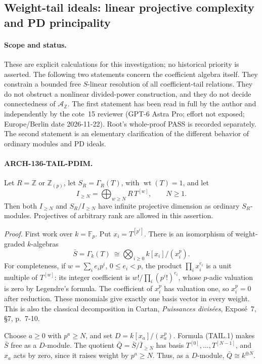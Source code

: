 \subsection{Weight-tail ideals: linear projective complexity and PD principality}
\label{arch136:tail-pdim}

\paragraph{Scope and status.}
These are explicit calculations for this investigation; no historical
priority is asserted.
The following two statements concern the coefficient algebra itself.
They constrain a bounded free \(S\)-linear resolution of all coefficient-tail
relations. They do not obstruct a nonlinear divided-power construction, and
they do not decide connectedness of \(\mathcal A_{\mathbb Z}\).
The first statement has been read in full by the author and independently
by the cote~15 reviewer (GPT-6 Astra Pro; effort not exposed;
Europe/Berlin date 2026-11-22). Root's whole-proof PASS is recorded
separately. The second statement is an elementary clarification of the
different behavior of ordinary modules and PD ideals.

\paragraph{ARCH-136-TAIL-PDIM.}
Let \(R=\mathbb Z\) or \(\mathbb Z_{(p)}\), let
\(S_R=\Gamma_R(T)\), with \(\operatorname{wt}(T)=1\), and let
\[
 I_{\ge N}=\bigoplus_{w\ge N}R\,T^{[w]},\qquad N\ge1.
\]
Then both \(I_{\ge N}\) and \(S_R/I_{\ge N}\) have infinite projective
dimension as ordinary \(S_R\)-modules. Projectives of arbitrary rank
are allowed in this assertion.

\emph{Proof.}
First work over \(k=\mathbb F_p\). Put \(x_i=T^{[p^i]}\). There is an
isomorphism of weight-graded \(k\)-algebras
\[
 \bar S=\Gamma_k(T)\ \cong
 \bigotimes_{i\ge0}k[x_i]/(x_i^p).
 \tag{TAIL.1}
\]
For completeness, if \(w=\sum_i e_i p^i\), \(0\le e_i<p\), the product
\(\prod_i x_i^{e_i}\) is a unit multiple of \(T^{[w]}\): its integer
coefficient is \(w!/\prod_i(p^i!)^{e_i}\), whose \(p\)-adic valuation is
zero by Legendre's formula. The coefficient of \(x_i^p\) has valuation
one, so \(x_i^p=0\) after reduction. These monomials give exactly one
basis vector in every weight. This is also the classical decomposition
in Cartan, \emph{Puissances divis\'ees}, Expos\'e~7, \S7, p.~7-10.

Choose \(a\ge0\) with \(p^a\ge N\), and set
\(D=k[x_a]/(x_a^p)\). Formula (TAIL.1) makes \(\bar S\) free as a
\(D\)-module. The quotient
\(\bar Q=\bar S/\bar I_{\ge N}\) has basis
\(T^{[0]},\ldots,T^{[N-1]}\), and \(x_a\) acts by zero, since it raises
weight by \(p^a\ge N\). Thus, as a \(D\)-module,
\(\bar Q\cong k^{\oplus N}\).

